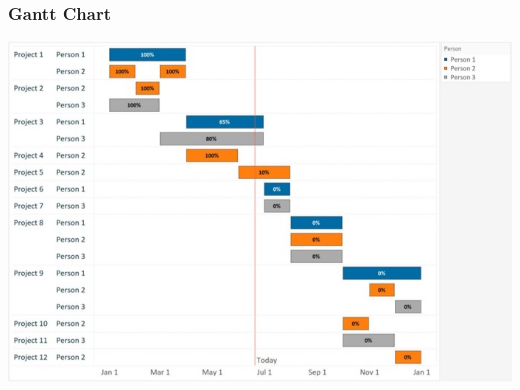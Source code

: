 \documentclass{article}
\begin{document}
    \subsubsection*{Gantt Chart}

    \begin{center}
        \includegraphics[scale=0.7]{gantt_chart.jpg}
    \end{center}
\end{document}
